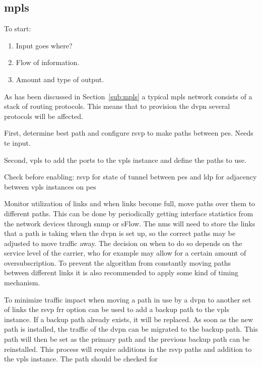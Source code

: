 
\subsection{\acs{mpls}} %
\label{sub:contemporary}
To start:
\begin{enumerate}
	\item Input goes where?
	\item Flow of information.
	\item Amount and type of output.
\end{enumerate}

As has been discussed in Section~\ref{sub:mpls} a typical \ac{mpls} network consists of a stack of routing protocols. This means that to provision the \ac{dvpn} several protocols will be affected. 

First, determine best path and configure \ac{rsvp} to make paths between \acp{pe}. Needs \ac{te} input. 

Second, \ac{vpls} to add the ports to the \ac{vpls} instance and define the paths to use.

Check before enabling: 
\ac{rsvp} for state of tunnel between \acp{pe} and
\ac{ldp} for adjacency between \ac{vpls} instances on \acp{pe}

Monitor utilization of links and when links become full, move paths over them to different paths. This can be done by periodically getting interface statistics from the network devices through \ac{snmp} or sFlow. The \ac{nms} will need to store the links that a path is taking when the \ac{dvpn} is set up, so the correct paths may be adjusted to move traffic away. The decision on when to do so depends on the service level of the carrier, who for example may allow for a certain amount of oversubscription. To prevent the algorithm from constantly moving paths between different links it is also recommended to apply some kind of timing mechanism.

To minimize traffic impact when moving a path in use by a \ac{dvpn} to another set of links the \ac{rsvp} \ac{frr} option can be used to add a backup path to the \ac{vpls} instance. If a backup path already exists, it will be replaced. As soon as the new path is installed, the traffic of the \ac{dvpn} can be migrated to the backup path. This path will then be set as the primary path and the previous backup path can be reinstalled. This process will require additions in the \ac{rsvp} paths and addition to the \ac{vpls} instance. The path should be checked for 

